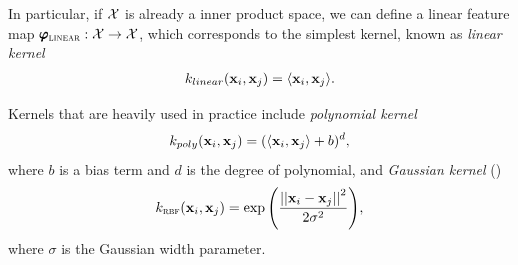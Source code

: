 {In particular, if $\mathcal{X}$ is already a inner product space, we can define a linear feature map $\pmb \varphi_{\text{\sc linear}}:\mathcal{X}\rightarrow\mathcal{X}$, which corresponds to the simplest kernel, known as \textit{linear kernel}
\begin{align*}
	k_{linear}(\mathbf {x}_i,\mathbf {x}_j) = \langle \mathbf {x}_i, \mathbf {x}_j \rangle.
\end{align*}

Kernels that are heavily used in practice include
\textit{polynomial kernel}
\begin{align*}
	k_{poly}(\mathbf {x}_i,\mathbf {x}_j) = (\langle \mathbf {x}_i, \mathbf {x}_j \rangle + b)^d,
\end{align*}
where $b$ is a bias term and $d$ is the degree of polynomial, and \textit{Gaussian kernel} (\rbf)
\begin{align*}
	k_{\text{{\sc rbf}}}(\mathbf {x}_i,\mathbf {x}_j) = \exp{\left(\frac{\left|\left| {\mathbf {x}_i}-{\mathbf {x}_j} \right|\right|^2}{2\sigma^2}\right)},
\end{align*}
where $\sigma$ is the Gaussian width parameter.

}
